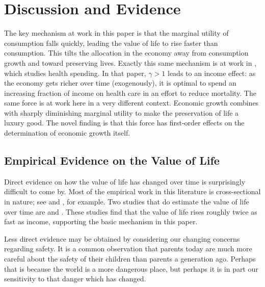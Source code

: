 \documentclass[12pt,twoside]{article}
\newcommand{\cn}[1]{\citet*{#1}}
\begin{document}
\section{Discussion and Evidence}

The key mechanism at work in this paper is that the marginal utility of
consumption falls quickly, leading the value of life to rise faster than
consumption. This tilts the allocation in the economy away from
consumption growth and toward preserving lives. Exactly this same
mechanism is at work in \cn{HallJones2007}, which studies health
spending. In that paper, $\gamma>1$ leads to an income effect: as the
economy gets richer over time (exogenously), it is optimal to spend an
increasing fraction of income on health care in an effort to reduce
mortality. The same force is at work here in a very different context.
Economic growth combines with sharply diminishing marginal utility to
make the preservation of life a luxury good. The novel finding is that
this force has first-order effects on the determination of economic
growth itself.


\subsection{Empirical Evidence on the Value of Life}

Direct evidence on how the value of life has changed over time is
surprisingly difficult to come by. Most of the empirical work in this
literature is cross-sectional in nature; see \cn{ViscusiAldy2003} and
\cn{AshenfelterGreenstone2004}, for example.  Two studies that do
estimate the value of life over time are \cn{CostaKahn2004} and
\cn{HammittLiuLiu2000}. These studies find that the value of life rises
roughly twice as fast as income, supporting the basic mechanism in this
paper. 

Less direct evidence may be obtained by considering our changing
concerns regarding safety.  It is a common observation that parents
today are much more careful about the safety of their children than
parents a generation ago.  Perhaps that is because the world is a more
dangerous place, but perhaps it is in part our sensitivity to that
danger which has changed.  
\end{document}
